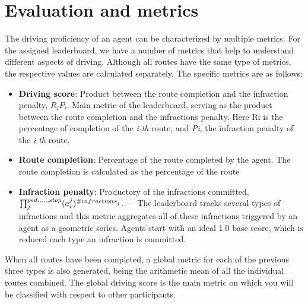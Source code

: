 \documentclass{article}
\begin{document}
\section{Evaluation and metrics}
The driving proficiency of an agent can be characterized by multiple metrics. For the assigned leaderboard, we have a number of metrics that help 
to understand different aspects of driving. Although all routes have the same type of metrics, the respective values are calculated separately. 
The specific metrics are as follows:
\begin{itemize}
  \item \textbf{Driving score}: Product between the route completion and the infraction penalty, $R_i P_i$. Main metric of the leaderboard, 
  serving as the product between the route completion and the infractions penalty. Here Ri is the percentage of completion of the \textit{i-th} route, and \textit{Pi}, 
  the infraction penalty of the \textit{i-th} route.
  \item \textbf{Route completion}: Percentage of the route completed by the agent. The route completion is calculated as the percentage of the route
  \item \textbf{Infraction penalty}: Productory of the infractions committed, $\prod_{j}^{ped., ..., stop} (a_{\small{i}}^{\small{j}})^{\small{\#infractions}_j}$. — The leaderboard 
  tracks several types of infractions and this metric aggregates all of these infractions triggered by an agent as a geometric series. Agents start with an ideal 1.0 
  base score, which is reduced each type an infraction is committed.
\end{itemize}
When all routes have been completed, a global metric for each of the previous three types is also generated, being the arithmetic mean of all the individual routes combined. 
The global driving score is the main metric on which you will be classified with respect to other participants.
\end{document}
